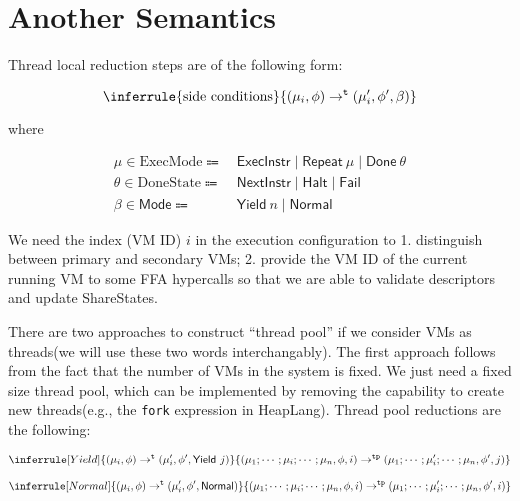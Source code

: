 \documentclass[a4paper]{article}
\newcommand*{\MODE}{\text{ExecMode}}
\newcommand*{\DONE}{\text{DoneState}}
\begin{document}
\newpage

\newcommand*{\tlr}{\rightarrow^{\mathtt{t}}}
\newcommand*{\tpr}{\rightarrow^{\mathtt{tp}}}

\section{Another Semantics}


Thread local reduction steps are of the following form:

\begin{displaymath}
  \inferrule{
    \text{side conditions}
  }{
    (\mu_{i}, \phi) \tlr (\mu'_{i}, \phi', \beta)
  }
\end{displaymath}

where

\begin{align*}
\mu \in \MODE \Coloneqq &\ \mathsf{ExecInstr} \mid \mathsf{Repeat}~\mu \mid \mathsf{Done}~\theta \\
\theta \in \DONE \Coloneqq &\ \mathsf{NextInstr} \mid \mathsf{Halt} \mid \mathsf{Fail}\\
\beta \in \mathsf{Mode} \Coloneqq &\ \mathsf{Yield}~n \mid \mathsf{Normal}
\end{align*}

We need the index (VM ID) $i$ in the execution configuration to 1. distinguish
between primary and secondary VMs; 2. provide the VM ID of the current running
VM to some FFA hypercalls so that we are able to validate descriptors and update
ShareStates.


There are two approaches to construct ``thread pool'' if we consider VMs as
threads(we will use these two words interchangably). The first approach follows from the fact that the number of VMs in the
system is fixed. We just need a fixed size thread pool, which can be implemented by removing the capability to create new threads(e.g., the \texttt{fork} expression in
HeapLang). Thread pool reductions are the following:

\begin{displaymath}
  \inferrule[Yield]{
    (\mu_i, \phi) \tlr (\mu_i', \phi', \mathsf{Yield}~j)
  }{
    (\mu_1;\cdots;\mu_i;\cdots;\mu_n, \phi, i) \tpr (\mu_1;\cdots;\mu_i';\cdots;\mu_n, \phi', j)
  }
\end{displaymath}

\begin{displaymath}
  \inferrule[Normal]{
    (\mu_i, \phi) \tlr (\mu_i', \phi', \mathsf{Normal})
  }{
    (\mu_1;\cdots;\mu_i;\cdots;\mu_n, \phi, i) \tpr (\mu_1;\cdots;\mu_i';\cdots;\mu_n, \phi', i)
  }
\end{displaymath}
\end{document}
